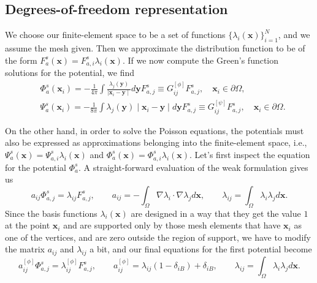 \documentclass[reprint]{revtex4}
\begin{document}
\subsection{Degrees-of-freedom representation}
We choose our finite-element space to be a set of functions $\{\lambda_i(\bm{x})\}_{i=1}^{N}$, and we assume the mesh given. Then we approximate the distribution function to be of the form $F^s_a(\bm{x})=F^s_{a,i}\lambda_i(\bm{x})$. If we now compute the Green's function solutions for the potential, we find
\begin{align}
&\Phi_a^s(\bm{x}_i)=-\frac{1}{4\pi}\int \frac{\lambda_j(\bm{y})}{\mid \bm{x}_i-\bm{y}\mid}d\bm{y}F_{a,j}^s\equiv G^{[\phi]}_{ij}F_{a,j}^s, \quad \bm{x}_i\in\partial\Omega,\\
&\Psi_a^s(\bm{x}_i)=-\frac{1}{8\pi}\int \lambda_j(\bm{y})\mid \bm{x}_i-\bm{y}\mid d\bm{y}F_{a,j}^s\equiv G^{[\psi]}_{ij}F_{a,j}^s, \quad \bm{x}_i\in\partial\Omega.
\end{align}

On the other hand, in order to solve the Poisson equations, the potentials must also be expressed as approximations belonging into the finite-element space, i.e., $\Psi^s_a(\bm{x})=\Psi^s_{a,i}\lambda_i(\bm{x})$ and $\Phi^s_a(\bm{x})=\Phi^s_{a,i}\lambda_i(\bm{x})$. Let's first inspect the equation for the potential $\Phi^s_a$. A straight-forward evaluation of the weak formulation gives us
\begin{equation}
a_{ij}\Phi^s_{a,j}=\lambda_{ij}F^s_{a,j},\qquad a_{ij}=-\int_\Omega\nabla\lambda_i\cdot\nabla\lambda_jd\bm{x},\qquad \lambda_{ij}=\int_\Omega\lambda_i\lambda_jd\bm{x}.
\end{equation}
Since the basis functions $\lambda_i(\bm{x})$ are designed in a way that they get the value $1$ at the point $\bm{x}_i$ and are supported only by those mesh elements that have $\bm{x}_i$ as one of the vertices, and are zero outside the region of support, we have to modify the matrix $a_{ij}$ and $\lambda_{ij}$ a bit, and our final equations for the first potential become
\begin{equation}
a_{ij}^{[\phi]}\Phi^s_{a,j}=\lambda^{[\phi]}_{ij}F^s_{a,j},\qquad a^{[\phi]}_{ij}=\lambda_{ij}\left(1-\delta_{iB}\right) + \delta_{iB},\qquad \lambda_{ij}=\int_\Omega\lambda_i\lambda_jd\bm{x}.
\end{equation}
\end{document}
